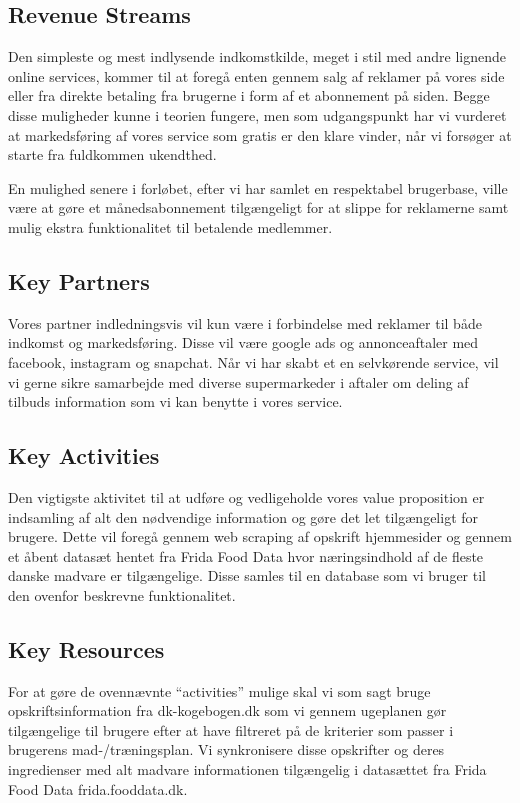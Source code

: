 \documentclass[a4paper,]{article}
\begin{document}
\subsection{Revenue Streams}
Den simpleste og mest indlysende indkomstkilde, meget i stil med andre lignende online services, kommer til at foregå enten gennem salg af reklamer på vores side eller fra direkte betaling fra brugerne i form af et abonnement på siden. Begge disse muligheder kunne i teorien fungere, men som udgangspunkt har vi vurderet at markedsføring af vores service som gratis er den klare vinder, når vi forsøger at starte fra fuldkommen ukendthed. 

En mulighed senere i forløbet, efter vi har samlet en respektabel brugerbase, ville være at gøre et månedsabonnement tilgængeligt for at slippe for reklamerne samt mulig ekstra funktionalitet til betalende medlemmer. 

\subsection{Key Partners}
Vores partner indledningsvis vil kun være i forbindelse med reklamer til både indkomst og markedsføring. Disse vil være google ads og annonceaftaler med facebook, instagram og snapchat. Når vi har skabt et en selvkørende service, vil vi gerne sikre samarbejde med diverse supermarkeder i aftaler om deling af tilbuds information som vi kan benytte i vores service.

\subsection{Key Activities}
Den vigtigste aktivitet til at udføre og vedligeholde vores value proposition er indsamling af alt den nødvendige information og gøre det let tilgængeligt for brugere. Dette vil foregå gennem web scraping af opskrift hjemmesider og gennem et åbent datasæt hentet fra Frida Food Data hvor næringsindhold af de fleste danske madvare er tilgængelige. Disse samles til en database som vi bruger til den ovenfor beskrevne funktionalitet. 

\subsection{Key Resources}
For at gøre de ovennævnte “activities” mulige skal vi som sagt bruge opskriftsinformation fra dk-kogebogen.dk som vi gennem ugeplanen gør tilgængelige til brugere efter at have filtreret på de kriterier som passer i brugerens mad-/træningsplan. Vi synkronisere disse opskrifter og deres ingredienser med alt madvare informationen tilgængelig i datasættet fra Frida Food Data frida.fooddata.dk.
\end{document}
